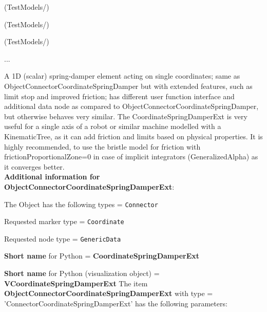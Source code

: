 \item {} (TestModels/)
\item {} (TestModels/)
\item {} (TestModels/)
\item  ...

\ei

%
\newpage

\label{sec:item:ObjectConnectorCoordinateSpringDamperExt}
A 1D (scalar) spring-damper element acting on single  coordinates; same as ObjectConnectorCoordinateSpringDamper but with extended features, such as limit stop and improved friction; has different user function interface and additional data node as compared to ObjectConnectorCoordinateSpringDamper, but otherwise behaves very similar. The CoordinateSpringDamperExt is very useful for a single axis of a robot or similar machine modelled with a KinematicTree, as it can add friction and limits based on physical properties. It is highly recommended, to use the bristle model for friction with frictionProportionalZone=0 in case of implicit integrators (GeneralizedAlpha) as it converges better.\vspace{12pt}
 \\{\bf Additional information for ObjectConnectorCoordinateSpringDamperExt}:
\bi
  \item The Object has the following types = \texttt{Connector}
  \item Requested marker type = \texttt{Coordinate}
  \item Requested node type = \texttt{GenericData}
  \item {\bf Short name} for Python = {\bf CoordinateSpringDamperExt}  \item {\bf Short name} for Python (visualization object) = {\bf VCoordinateSpringDamperExt}\ei
\vspace{12pt} \noindent The item {\bf ObjectConnectorCoordinateSpringDamperExt} with type = 'ConnectorCoordinateSpringDamperExt' has the following parameters:\vspace{-1cm}\\ 
